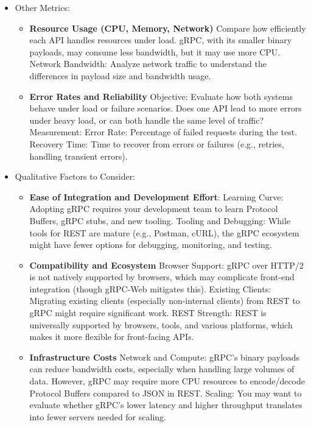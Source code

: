 \begin{itemize}
    \item Other Metrics:
    \begin{itemize} 
        \item \textbf{Resource Usage (CPU, Memory, Network)}
        Compare how efficiently each API handles resources under load. gRPC, with its smaller binary payloads, may consume less bandwidth, but it may use more CPU. Network Bandwidth: Analyze network traffic to understand the differences in payload size and bandwidth usage.
        
        \item \textbf{Error Rates and Reliability}
        Objective: Evaluate how both systems behave under load or failure scenarios. Does one API lead to more errors under heavy load, or can both handle the same level of traffic? Measurement: Error Rate: Percentage of failed requests during the test. Recovery Time: Time to recover from errors or failures (e.g., retries, handling transient errors).
    \end{itemize}
   
    \item Qualitative Factors to Consider:
    \begin{itemize}
        \item \textbf{Ease of Integration and Development Effort}: 
        Learning Curve: Adopting gRPC requires your development team to learn Protocol Buffers, gRPC stubs, and new tooling. Tooling and Debugging: While tools for REST are mature (e.g., Postman, cURL), the gRPC ecosystem might have fewer options for debugging, monitoring, and testing.
        
        \item \textbf{Compatibility and Ecosystem}
        Browser Support: gRPC over HTTP/2 is not natively supported by browsers, which may complicate front-end integration (though gRPC-Web mitigates this). Existing Clients: Migrating existing clients (especially non-internal clients) from REST to gRPC might require significant work. REST Strength: REST is universally supported by browsers, tools, and various platforms, which makes it more flexible for front-facing APIs.
        
        \item \textbf{Infrastructure Costs}
        Network and Compute: gRPC’s binary payloads can reduce bandwidth costs, especially when handling large volumes of data. However, gRPC may require more CPU resources to encode/decode Protocol Buffers compared to JSON in REST. Scaling: You may want to evaluate whether gRPC's lower latency and higher throughput translates into fewer servers needed for scaling.
    \end{itemize}
\end{itemize}
